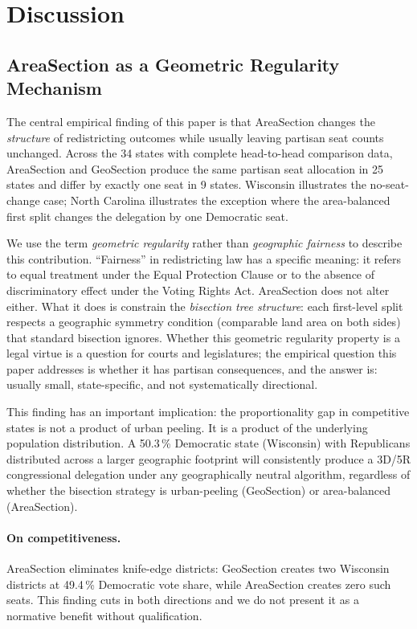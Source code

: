 \section{Discussion}
\label{sec:discussion}

\subsection{AreaSection as a Geometric Regularity Mechanism}

The central empirical finding of this paper is that AreaSection changes the
\emph{structure} of redistricting outcomes while usually leaving partisan seat
counts unchanged.
Across the 34 states with complete head-to-head comparison data,
AreaSection and GeoSection produce the same partisan seat allocation in 25
states and differ by exactly one seat in 9 states.
Wisconsin illustrates the no-seat-change case; North Carolina illustrates the
exception where the area-balanced first split changes the delegation by one
Democratic seat.

We use the term \emph{geometric regularity} rather than \emph{geographic
fairness} to describe this contribution.
``Fairness'' in redistricting law has a specific meaning: it refers to equal
treatment under the Equal Protection Clause or to the absence of discriminatory
effect under the Voting Rights Act.
AreaSection does not alter either.
What it does is constrain the \emph{bisection tree structure}: each first-level
split respects a geographic symmetry condition (comparable land area on both
sides) that standard bisection ignores.
Whether this geometric regularity property is a legal virtue is a question for
courts and legislatures; the empirical question this paper addresses is whether
it has partisan consequences, and the answer is: usually small, state-specific,
and not systematically directional.

This finding has an important implication: the proportionality gap in competitive
states is not a product of urban peeling.
It is a product of the underlying population distribution.
A 50.3\,\% Democratic state (Wisconsin) with Republicans distributed across
a larger geographic footprint will consistently produce a 3D/5R congressional
delegation under any geographically neutral algorithm, regardless of whether
the bisection strategy is urban-peeling (GeoSection) or area-balanced
(AreaSection).

\paragraph{On competitiveness.}
AreaSection eliminates knife-edge districts: GeoSection creates two Wisconsin
districts at 49.4\,\% Democratic vote share, while AreaSection creates zero
such seats.
This finding cuts in both directions and we do not present it as a normative
benefit without qualification.


